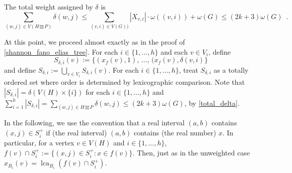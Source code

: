 \documentclass{patmorin}
\renewcommand{\le}{\leqslant}
\DeclareMathOperator{\lca}{lca}
\begin{document}
  The total weight assigned by $\delta$ is
  \begin{equation}
  \sum_{(w,j)\in V(H\boxtimes P)} \delta(w,j)
  \le \sum_{(v,i)\in V(G))}|X_{v,i}|\cdot\omega((v,i)) + \omega(G)
  \le
  (2k+3)\omega(G) \enspace . \label{total_delta}
  \end{equation}

  At this point, we proceed almost exactly as in the proof of \cref{shannon_fano_elias_tree}.
  For each $i\in\{1,\ldots,h\}$ and each $v\in V_i$, define
  \[
     S_{\delta,i}(v):=\{(x_f(v),1),\,\ldots,\, (x_f(v),\delta(v,i)\}
  \]
  and define $S_{\delta,i}:=\bigcup_{v\in V_i}S_{\delta,i}(v)$.  For each $i\in\{1,\ldots,h\}$, treat $S_{\delta,i}$ as a totally ordered set where order is determined by lexicographic comparison.  Note that $|S_{\delta,i}|=\delta(V(H)\times\{i\})$ for each $i\in\{1,\ldots,h\}$ and $\sum_{i=1}^h |S_{\delta,i}|=\sum_{(w,j)\in H\boxtimes P}\delta(w,j)\le (2k+3)\omega(G)$, by \cref{total_delta}.

  In the following, we use the convention that a real interval $(a,b)$ contains $(x,j)\in S^+_i$ if (the real interval) $(a,b)$ contains (the real number) $x$. In particular, for a vertex $v\in V(H)$ and $i\in\{1,\ldots,h\}$, $f(v)\cap S^+_i:=\{(x,j)\in S^+_i:x\in f(v)\}$. Then, just as in the unweighted case $x_{B_i}(v)=\lca_{B_i}(f(v)\cap S^+_i)$.  
  
\end{document}
